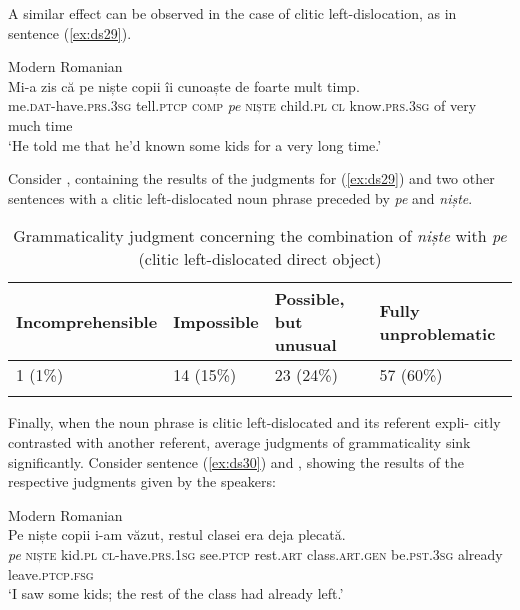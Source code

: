 \documentclass[output=paper,colorlinks,citecolor=brown]{langscibook}
\begin{document}
A similar effect can be observed in the case of clitic left-dislocation, as in sentence (\ref{ex:ds29}).

\ea\label{ex:ds29} Modern Romanian\\
\gll Mi{}-a       zis       c\u{a}       pe niște copii   îi cunoaște   de foarte mult   timp.\\
     me.\textsc{dat-}have.\textsc{prs.3sg} tell.\textsc{ptcp} \textsc{comp} \textit{pe} \textsc{niște} child.\textsc{pl}   \textsc{cl} know.\textsc{prs.3sg}   of very    much time\\
\glt ‘He told me that he’d known some kids for a very long time.’
\z

Consider , containing the results of the judgments for (\ref{ex:ds29}) and two other sentences with a clitic left-dislocated noun phrase preceded by \textit{pe} and \textit{niște}.\largerpage

\begin{table}[H]
\begin{tabularx}{\textwidth}{XXXX}
\lsptoprule
Incomprehensible & Impossible & Possible, \linebreak but unusual & Fully \linebreak \mbox{unproblematic}\\
\midrule
1 (1\%) & 14 (15\%) & 23 (24\%) & 57 (60\%)\\
\lspbottomrule
\end{tabularx}
\caption{Grammaticality judgment concerning the combination of \textit{niște} with \textit{pe} (clitic left-dislocated direct object)}
\label{tab:ds10}
\end{table}

Finally, when the noun phrase is clitic left-dislocated and its referent expli- citly contrasted with another referent, average judgments of grammaticality sink significantly. Consider sentence (\ref{ex:ds30}) and , showing the results of the respective judgments given by the speakers:

\ea\label{ex:ds30} Modern Romanian\\
\gll Pe niște copii  i-am          v\u{a}zut,      restul clasei     era           deja   plecat\u{a}.\\
     \textit{pe} \textsc{niște} kid.\textsc{pl} \textsc{cl}{}-have.\textsc{prs.1sg} see.\textsc{ptcp} rest.\textsc{art} class.\textsc{art.gen}   be.\textsc{pst}.3\textsc{sg} already   leave.\textsc{ptcp.fsg}\\
\glt ‘I saw some kids; the rest of the class had already left.’
\z
\end{document}
